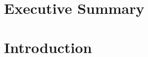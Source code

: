\documentclass[a4paper,10pt,twoside]{report}
\author{\me}
\begin{document}
\renewcommand\bibname{References}


\normalsize

\newpage


%

%

\chapter*{Executive Summary}\label{chapter:Executive Summary}


\newpage

%





\chapter{Introduction}\label{chapter:introduction}
\setcounter{page}{0}




%



\newpage

\appendix



\end{document}

